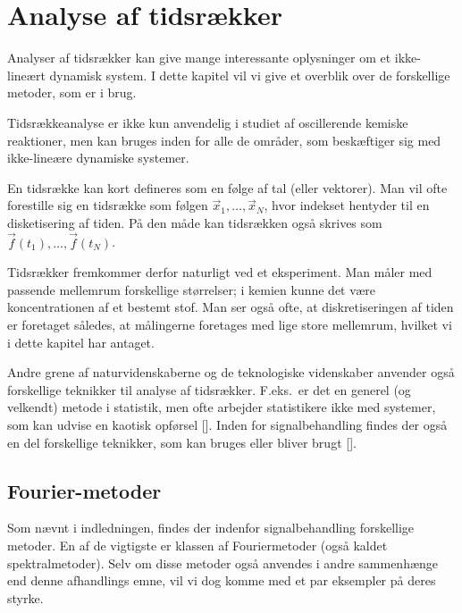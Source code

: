 \chapter{Analyse af tidsr{\ae}kker}
Analyser af tidsr{\ae}kker kan give mange interessante
oplysninger om et ikke-line{\ae}rt dynamisk system. I dette
kapitel vil vi give et overblik over de forskellige
metoder, som er i brug.

\vspace{4.0mm}
Tidsr{\ae}kkeanalyse er ikke kun anvendelig i studiet af
oscillerende kemiske reaktioner, men kan bruges inden for
alle de omr{\aa}der, som besk{\ae}ftiger sig med
ikke-line{\ae}re dynamiske systemer.

\vspace{4.0mm}
En tidsr{\ae}kke kan kort defineres som en f{\o}lge af tal
(eller vektorer). Man vil ofte forestille sig en
tidsr{\ae}kke som f{\o}lgen $\vec{x}_1, \ldots, \vec{x}_N$,
hvor indekset hentyder til en disketisering af tiden.
P{\aa} den m{\aa}de kan tidsr{\ae}kken ogs{\aa} skrives som
$\vec{f}(t_1), \ldots, \vec{f}(t_N)$.

\vspace{4.0mm}
Tidsr{\ae}kker fremkommer derfor naturligt ved et
eksperiment. Man m{\aa}ler med passende mellemrum
forskellige st{\o}rrelser; i kemien kunne det v{\ae}re
koncentrationen af et bestemt stof. Man ser ogs{\aa} ofte,
at diskretiseringen af tiden er foretaget s{\aa}ledes, at
m{\aa}lingerne foretages med lige store mellemrum, hvilket
vi i dette kapitel har antaget.

\vspace{4.0mm}
Andre grene af naturvidenskaberne og de teknologiske
videnskaber anvender ogs{\aa} forskellige teknikker til
analyse af tidsr{\ae}kker. F.eks.\ er det en generel (og
velkendt) metode i statistik, men ofte arbejder
statistikere ikke med systemer, som kan udvise en kaotisk
opf{\o}rsel []. Inden for
signalbehandling findes der ogs{\aa} en del forskellige
teknikker, som kan bruges eller bliver brugt
[].

\newpage
\section{Fourier-metoder}
Som n{\ae}vnt i indledningen, findes der indenfor
signalbehandling forskellige metoder. En af de vigtigste er
klassen af Fouriermetoder (ogs{\aa} kaldet
spektralmetoder). Selv om disse metoder ogs{\aa} anvendes i
andre sammenh{\ae}nge end denne afhandlings emne, vil vi
dog komme med et par eksempler p{\aa} deres styrke.

